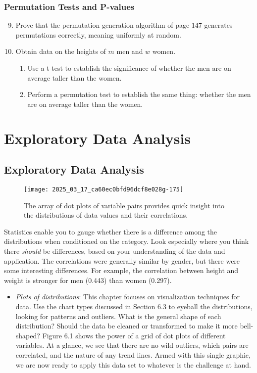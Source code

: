 \documentclass[10pt]{article}
\begin{document}
\subsection*{Permutation Tests and P-values}

\begin{enumerate}
    \setcounter{enumi}{8}
    \item Prove that the permutation generation algorithm of page 147 generates permutations correctly, meaning uniformly at random.

    \item Obtain data on the heights of $m$ men and $w$ women.
    \begin{enumerate}
        \item Use a t-test to establish the significance of whether the men are on average taller than the women.
        \item Perform a permutation test to establish the same thing: whether the men are on average taller than the women.
    \end{enumerate}
\end{enumerate}

\chapter{Exploratory Data Analysis}

\section{Exploratory Data Analysis}

\begin{figure}[h]
    \centering
    \texttt{[image: 2025\_03\_17\_ca60ec0bfd96dcf8e028g-175]}
    \caption{The array of dot plots of variable pairs provides quick insight into the distributions of data values and their correlations.}
\end{figure}

Statistics enable you to gauge whether there is a difference among the distributions when conditioned on the category. Look especially where you think there \emph{should} be differences, based on your understanding of the data and application. The correlations were generally similar by gender, but there were some interesting differences. For example, the correlation between height and weight is stronger for men (0.443) than women (0.297).

\begin{itemize}
  \item \emph{Plots of distributions}: This chapter focuses on visualization techniques for data. Use the chart types discussed in Section 6.3 to eyeball the distributions, looking for patterns and outliers. What is the general shape of each distribution? Should the data be cleaned or transformed to make it more bell-shaped? Figure 6.1 shows the power of a grid of dot plots of different variables. At a glance, we see that there are no wild outliers, which pairs are correlated, and the nature of any trend lines. Armed with this single graphic, we are now ready to apply this data set to whatever is the challenge at hand.
\end{itemize}
\end{document}

